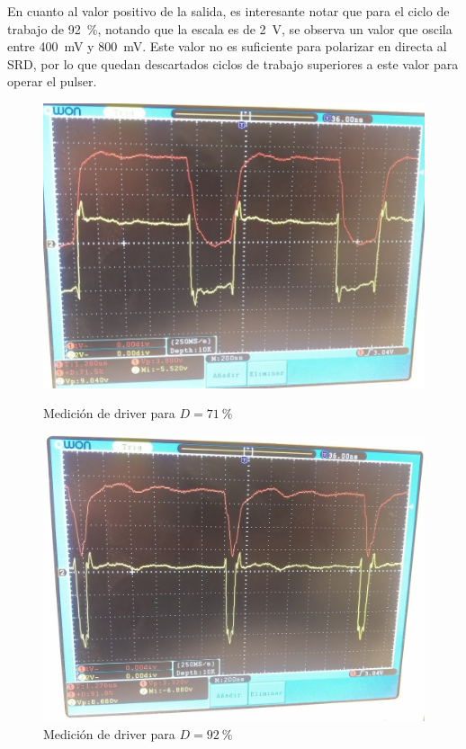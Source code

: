 En cuanto al valor positivo de la salida, es interesante notar que para el ciclo
de trabajo de \qty{92}{\percent}, notando que la escala es de \qty{2}{\volt}, se
observa un valor que oscila entre \qty{400}{\milli\volt} y
\qty{800}{\milli\volt}. Este valor no es suficiente para polarizar en directa al
SRD, por lo que quedan descartados ciclos de trabajo superiores a este valor
para operar el pulser.

\begin{figure}[t!]
    \begin{minipage}[t]{0.45\linewidth}
        \centering
        \includegraphics[width=1\textwidth]{images/medicion_driver_D_71.jpg}
        \caption{Medición de driver para $D= \qty{71}{\percent}$}
        \label{fig:medicion_driver_D_71}
    \end{minipage}
    \hfill
    \begin{minipage}[t]{0.45\linewidth}
        \centering
        \includegraphics[width=1\textwidth]{images/medicion_driver_D_92.jpg}
        \caption{Medición de driver para $D= \qty{92}{\percent}$}
        \label{fig:medicion_driver_D_92}
    \end{minipage}
\end{figure}

